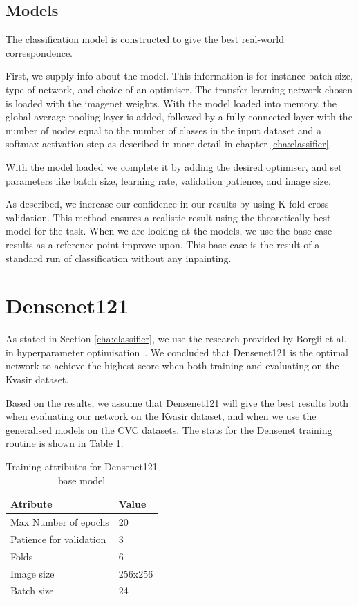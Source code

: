 \subsection{Models}
The classification model is constructed to give the best real-world correspondence.

First, we supply info about the model. This information is for instance batch size, type of network, and choice of an optimiser. 
The transfer learning network chosen is loaded with the imagenet weights. With the model loaded into memory, the global average pooling layer is added, followed by a fully connected layer with the number of nodes equal to the number of classes in the input dataset and a softmax activation step as described in more detail in chapter \ref{cha:classifier}. 

With the model loaded we complete it by adding the desired optimiser, and set parameters like batch size, learning rate, validation patience, and image size.

As described, we increase our confidence in our results by using K-fold cross-validation. This method ensures a realistic result using the theoretically best model for the task. 
When we are looking at the models, we use the base case results as a reference point improve upon. This base case is the result of a standard run of classification without any inpainting.


\FloatBarrier
\section{Densenet121}

As stated in Section \ref{cha:classifier}, we use the research provided by Borgli et al. in hyperparameter optimisation~\cite{runeMedico2018}. We concluded that Densenet121 is the optimal network to achieve the highest score when both training and evaluating on the Kvasir dataset. 

Based on the results, we assume that Densenet121 will give the best results both when evaluating our network on the Kvasir dataset, and when we use the generalised models on the CVC datasets. The stats for the Densenet training routine is shown in Table \ref{tab:TrainingAttrDN121}.



\begin{table}[h]
\caption{Training attributes for Densenet121 base model }
\begin{center}
\begin{tabular}{ll}
\toprule
Atribute                & Value   \\
\midrule
Max Number of epochs    & 20      \\
Patience for validation & 3       \\
Folds                   & 6       \\
Image size              & 256x256 \\
Batch size              & 24      \\   
\bottomrule
\end{tabular}
\end{center}
\label{tab:TrainingAttrDN121}
\end{table}

